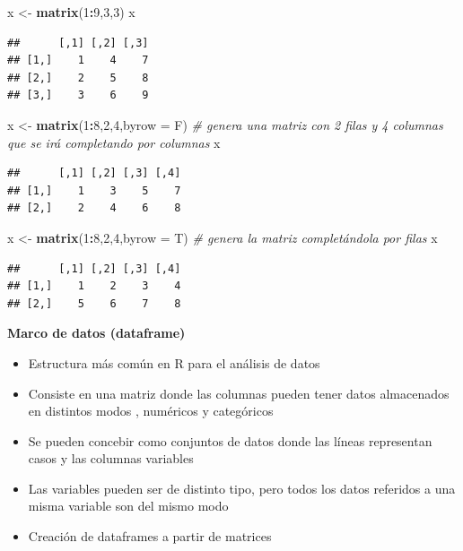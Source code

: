\documentclass[]{article}
\newenvironment{Shaded}{\begin{snugshade}}{\end{snugshade}}
\newcommand{\CommentTok}[1]{\textcolor[rgb]{0.56,0.35,0.01}{\textit{#1}}}
\newcommand{\DataTypeTok}[1]{\textcolor[rgb]{0.13,0.29,0.53}{#1}}
\newcommand{\DecValTok}[1]{\textcolor[rgb]{0.00,0.00,0.81}{#1}}
\newcommand{\KeywordTok}[1]{\textcolor[rgb]{0.13,0.29,0.53}{\textbf{#1}}}
\newcommand{\NormalTok}[1]{#1}
\newcommand{\OperatorTok}[1]{\textcolor[rgb]{0.81,0.36,0.00}{\textbf{#1}}}
\newcommand{\StringTok}[1]{\textcolor[rgb]{0.31,0.60,0.02}{#1}}
\begin{document}
\begin{Shaded}
\begin{Highlighting}[]
\NormalTok{x <-}\StringTok{ }\KeywordTok{matrix}\NormalTok{(}\DecValTok{1}\OperatorTok{:}\DecValTok{9}\NormalTok{,}\DecValTok{3}\NormalTok{,}\DecValTok{3}\NormalTok{)}
\NormalTok{x}
\end{Highlighting}
\end{Shaded}

\begin{verbatim}
##      [,1] [,2] [,3]
## [1,]    1    4    7
## [2,]    2    5    8
## [3,]    3    6    9
\end{verbatim}

\begin{Shaded}
\begin{Highlighting}[]
\NormalTok{x <-}\StringTok{ }\KeywordTok{matrix}\NormalTok{(}\DecValTok{1}\OperatorTok{:}\DecValTok{8}\NormalTok{,}\DecValTok{2}\NormalTok{,}\DecValTok{4}\NormalTok{,}\DataTypeTok{byrow =}\NormalTok{ F) }\CommentTok{# genera una matriz con 2 filas y 4 columnas que se irá completando por columnas}
\NormalTok{x}
\end{Highlighting}
\end{Shaded}

\begin{verbatim}
##      [,1] [,2] [,3] [,4]
## [1,]    1    3    5    7
## [2,]    2    4    6    8
\end{verbatim}

\begin{Shaded}
\begin{Highlighting}[]
\NormalTok{x <-}\StringTok{ }\KeywordTok{matrix}\NormalTok{(}\DecValTok{1}\OperatorTok{:}\DecValTok{8}\NormalTok{,}\DecValTok{2}\NormalTok{,}\DecValTok{4}\NormalTok{,}\DataTypeTok{byrow =}\NormalTok{ T) }\CommentTok{# genera la matriz completándola por filas}
\NormalTok{x}
\end{Highlighting}
\end{Shaded}

\begin{verbatim}
##      [,1] [,2] [,3] [,4]
## [1,]    1    2    3    4
## [2,]    5    6    7    8
\end{verbatim}

\textbf{Marco de datos (dataframe)}

\begin{itemize}
\item
  Estructura más común en R para el análisis de datos
\item
  Consiste en una matriz donde las columnas pueden tener datos
  almacenados en distintos modos , numéricos y categóricos
\item
  Se pueden concebir como conjuntos de datos donde las líneas
  representan casos y las columnas variables
\item
  Las variables pueden ser de distinto tipo, pero todos los datos
  referidos a una misma variable son del mismo modo
\item
  Creación de dataframes a partir de matrices
\end{itemize}
\end{document}
